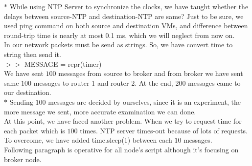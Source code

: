 $*$ While using NTP Server to synchronize the clocks, we have taught whether the delays between source-NTP and destination-NTP are same? Just to be sure, we used ping command on both source and destination VMs, and difference between round-trip time is nearly at most 0.1 ms, which we will neglect from now on.\\

In our network packets must be send as strings. So, we have convert time to string then send it.\\
$>>$ MESSAGE = repr(timer)\\

We have sent $100$ messages from source to broker and from broker we have sent same $100$ messages to router 1 and router 2. At the end, $200$ messages came to our destination. \\

$*$ Sending $100$ messages are decided by ourselves, since it is an experiment, the more message we sent, more accurate examination we can done.\\

At this point, we have faced another problem. When we try to request time for each packet which is $100$ times. NTP server times-out because of lots of requests. To overcome, we have added time.sleep(1) between each $10$ messages.\\

Following paragraph is operative for all node's script although it's focusing on broker node.\\

